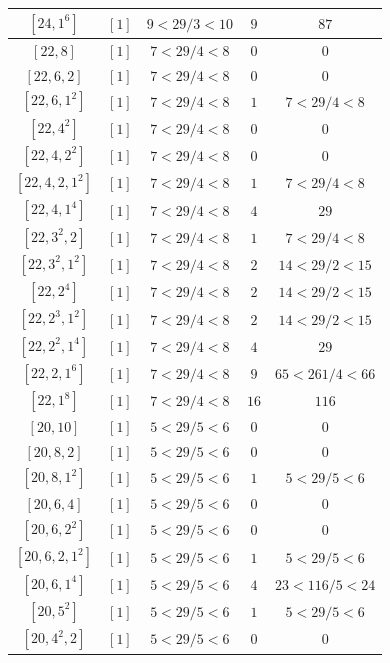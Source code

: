 \documentclass{article}%
\begin{document}
\begin{center}
\begin{longtable}{||c|c|c|c|c||}
$[24, 1^{6}]$ & $[1]$ & $9 < 29/3 < 10$ & $9$ & $87$ \\ \hline 
$[22, 8]$ & $[1]$ & $7 < 29/4 < 8$ & $0$ & $0$ \\ \hline 
$[22, 6, 2]$ & $[1]$ & $7 < 29/4 < 8$ & $0$ & $0$ \\ \hline 
$[22, 6, 1^{2}]$ & $[1]$ & $7 < 29/4 < 8$ & $1$ & $7 < 29/4 < 8$ \\ \hline 
$[22, 4^{2}]$ & $[1]$ & $7 < 29/4 < 8$ & $0$ & $0$ \\ \hline 
$[22, 4, 2^{2}]$ & $[1]$ & $7 < 29/4 < 8$ & $0$ & $0$ \\ \hline 
$[22, 4, 2, 1^{2}]$ & $[1]$ & $7 < 29/4 < 8$ & $1$ & $7 < 29/4 < 8$ \\ \hline 
$[22, 4, 1^{4}]$ & $[1]$ & $7 < 29/4 < 8$ & $4$ & $29$ \\ \hline 
$[22, 3^{2}, 2]$ & $[1]$ & $7 < 29/4 < 8$ & $1$ & $7 < 29/4 < 8$ \\ \hline 
$[22, 3^{2}, 1^{2}]$ & $[1]$ & $7 < 29/4 < 8$ & $2$ & $14 < 29/2 < 15$ \\ \hline 
$[22, 2^{4}]$ & $[1]$ & $7 < 29/4 < 8$ & $2$ & $14 < 29/2 < 15$ \\ \hline 
$[22, 2^{3}, 1^{2}]$ & $[1]$ & $7 < 29/4 < 8$ & $2$ & $14 < 29/2 < 15$ \\ \hline 
$[22, 2^{2}, 1^{4}]$ & $[1]$ & $7 < 29/4 < 8$ & $4$ & $29$ \\ \hline 
$[22, 2, 1^{6}]$ & $[1]$ & $7 < 29/4 < 8$ & $9$ & $65 < 261/4 < 66$ \\ \hline 
$[22, 1^{8}]$ & $[1]$ & $7 < 29/4 < 8$ & $16$ & $116$ \\ \hline 
$[20, 10]$ & $[1]$ & $5 < 29/5 < 6$ & $0$ & $0$ \\ \hline 
$[20, 8, 2]$ & $[1]$ & $5 < 29/5 < 6$ & $0$ & $0$ \\ \hline 
$[20, 8, 1^{2}]$ & $[1]$ & $5 < 29/5 < 6$ & $1$ & $5 < 29/5 < 6$ \\ \hline 
$[20, 6, 4]$ & $[1]$ & $5 < 29/5 < 6$ & $0$ & $0$ \\ \hline 
$[20, 6, 2^{2}]$ & $[1]$ & $5 < 29/5 < 6$ & $0$ & $0$ \\ \hline 
$[20, 6, 2, 1^{2}]$ & $[1]$ & $5 < 29/5 < 6$ & $1$ & $5 < 29/5 < 6$ \\ \hline 
$[20, 6, 1^{4}]$ & $[1]$ & $5 < 29/5 < 6$ & $4$ & $23 < 116/5 < 24$ \\ \hline 
$[20, 5^{2}]$ & $[1]$ & $5 < 29/5 < 6$ & $1$ & $5 < 29/5 < 6$ \\ \hline 
$[20, 4^{2}, 2]$ & $[1]$ & $5 < 29/5 < 6$ & $0$ & $0$ \\ \hline 

\end{longtable}
\end{center}
\end{document}

